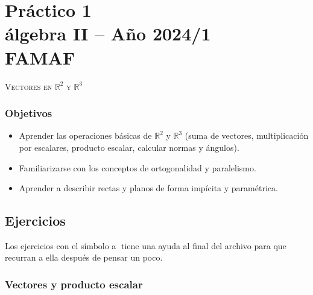 \chapter*{Práctico 1 \\álgebra  II -- Año 2024/1 \\ FAMAF}\label{practico-1}
    
    
\bigbreak


\centerline{\textsc{Vectores en $\mathbb R^2$ y $\mathbb R^3$}}


\bigbreak

\subsection*{Objetivos}

\begin{itemize}
 \item Aprender las operaciones básicas de $\mathbb R^2$ y $\mathbb R^3$ (suma de vectores, multiplicación por escalares, producto escalar, calcular normas y ángulos).
 \item Familiarizarse con los conceptos de ortogonalidad y paralelismo.
 \item Aprender a describir rectas y planos de forma impícita y paramétrica.
\end{itemize}


\section*{Ejercicios}

Los ejercicios con el símbolo \textcircled{a} tiene una ayuda al final del archivo para que recurran a ella después de pensar un poco.


\subsection*{Vectores y producto escalar}

